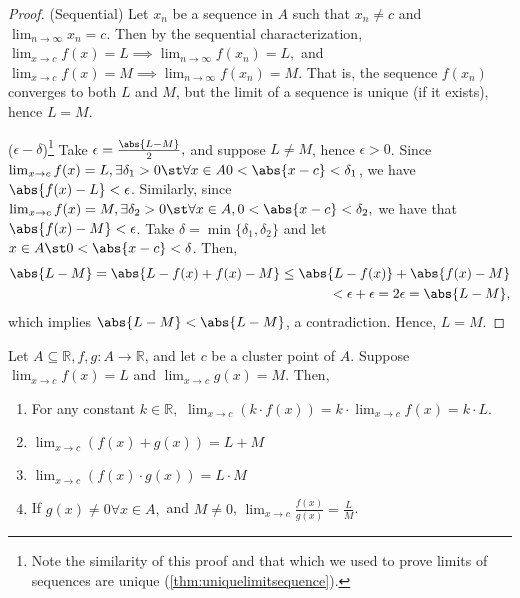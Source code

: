 \documentclass[12pt]{article}
\renewcommand{\qedsymbol}{\Libra}
\begin{document}
\begin{proof}(Sequential) Let $x_n$ be a sequence in $A$ such that $x_n \neq c$ and $\lim_{n\to\infty} x_n = c$. Then by the sequential characterization, $\lim_{x\to c} f(x) = L \implies \lim_{n\to\infty} f(x_n) = L,$ and $\lim_{x\to c} f(x) = M \implies \lim_{n\to \infty} f(x_n) = M$. That is, the sequence $f(x_n)$ converges to both $L$ and $M$, but the limit of a sequence is unique (if it exists), hence $L = M$. $\qquad$ \qedsymbol

\noindent($\epsilon-\delta$)\footnote{Note the similarity of this proof and that which we used to prove limits of sequences are unique (\cref{thm:uniquelimitsequence}).} Take $\epsilon = \frac{\abs{L - M}}{2},$ and suppose $L \neq M$, hence $\epsilon > 0$. Since $\lim_{x\to c}f(x) = L, \exists \delta_1 > 0 \st \forall x \in A 0 < \abs{x - c} < \delta_1$, we have $\abs{f(x) - L} < \epsilon$. Similarly, since $\lim_{x \to c} f(x) = M, \exists \delta_2 > 0 \st \forall x \in A, 0 < \abs{x - c} < \delta_2,$ we have that $\abs{f(x) - M} < \epsilon$. Take $\delta = \min\{\delta_1, \delta_2 \}$ and let $x \in A \st 0 < \abs{x - c} < \delta$. Then, \begin{align*}
  \abs{L - M} = \abs{L - f(x) + f(x) - M} \leq \abs{L - f(x)} + \abs{f(x) - M} \\
  < \epsilon + \epsilon = 2 \epsilon = \abs{L - M},
\end{align*}
which implies $\abs{L - M} < \abs{L - M}$, a contradiction. Hence, $L = M$.
\end{proof}

\begin{theorem}\label{thm:algebraicpropfunctionallimit}
  Let $A \subseteq \mathbb{R}, f, g : A \to \mathbb{R}$, and let $c$ be a cluster point of $A$. Suppose $\lim_{x\to c} f(x) = L$ and $\lim_{x \to c} g(x) = M$. Then,
  \begin{enumerate}
    \item For any constant $k \in \mathbb{R},$ $
      \lim_{x \to c} (k \cdot f(x)) = k \cdot \lim_{x\to c} f(x) = k \cdot L.$
    \item $\lim_{x\to c}(f(x) + g(x)) = L + M$
    \item $\lim_{x\to c} (f(x) \cdot g(x)) = L \cdot M$
    \item If $g(x) \neq 0 \forall x \in A,$ and $M \neq 0$, $\lim_{x\to c} \frac{f(x)}{g(x)} = \frac{L}{M}$.
  \end{enumerate}
\end{theorem}
\end{document}

